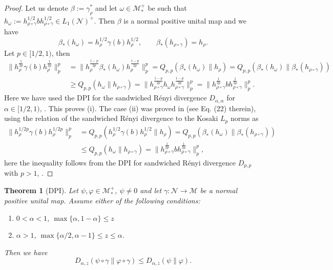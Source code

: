 \documentclass[12pt]{article}
\newtheorem{theorem}{Theorem}
\theoremstyle{definition}
\theoremstyle{remark}
\def\Me{\mathcal M}
\def\Ne{\mathcal N}
\begin{document}
\begin{proof} Let us denote $\beta:=\gamma_\rho^*$ and let $\omega\in \Me_*^+$ be such
that 
$h_\omega:=h_{\rho\circ\gamma}^{1/2}bh_{\rho\circ\gamma}^{1/2}\in L_1(\Ne)^+$. Then
$\beta$ is a normal positive unital map and  we have 
\[
\beta_*(h_\omega)=h_\rho^{1/2}\gamma(b)h_\rho^{1/2},\qquad
\beta_*(h_{\rho\circ\gamma})=h_\rho.
\]
Let $p\in [1/2,1)$, then  
\begin{align*}
\|h_{\rho}^{\frac{1}{2p}}\gamma(b)h_{\rho}^{\frac{1}{2p}}\|^p_p&=
\|h_\rho^{\frac{1-p}{2p}}\beta_*(h_\omega)h_\rho^{\frac{1-p}{2p}}\|_p^p=
Q_{p,p}(\beta_*(h_\omega)\|h_\rho)=Q_{p,p}(\beta_*(h_\omega)\|\beta_*(h_{\rho\circ\gamma}))\\
&\ge  Q_{p,p}(h_\omega\|h_{\rho\circ\gamma})=\|h_{\rho\circ\gamma}^{\frac{1-p}{2p}}h_\omega
h_{\rho\circ\gamma}^{\frac{1-p}{2p}}\|_p^p=\|h_{\rho\circ\gamma}^{\frac{1}{2p}}bh_{\rho\circ\gamma}^{\frac{1}{2p}}\|^p_p.
\end{align*}
Here we have used the DPI for the sandwiched R\'enyi  divergence $D_{\alpha,\alpha}$ for
$\alpha\in [1/2,1)$, \cite[Theorem 4.1]{jencova2021renyi}.  This proves (i). 
The case (ii) was proved in \cite{kato2023onrenyi} (see Eq. (22) therein), using the
relation of the sandwiched R\'enyi divergence to the Kosaki $L_p$ norms as
\begin{align*}
\|h_\rho^{1/2p}\gamma(b)h_\rho^{1/2p}\|_p^p&=Q_{p,p}(h_\rho^{1/2}\gamma(b)h_\rho^{1/2}\|h_\rho)=Q_{p,p}(\beta_*(h_\omega)\|\beta_*(h_{\rho\circ\gamma}))\\
&\le
Q_{p,p}(h_\omega\|h_{\rho\circ\gamma})=\|h_{\rho\circ\gamma}^{\frac{1}{2p}}bh_{\rho\circ\gamma}^{\frac{1}{2p}}\|^p_p,
\end{align*}
here the inequality follows from the DPI for sandwiched R\'enyi divergence $D_{p,p}$ with
$p>1$, \cite[]{jencova2018renyi}.


\end{proof}




\begin{theorem}[DPI] \label{thm:dpi} Let $\psi,\varphi\in \Me_*^+$, $\psi\ne 0$ and let $\gamma:
\Ne\to \Me$ be a normal positive unital map. Assume either of the following conditions:
\begin{enumerate}
\item[(i)] $0<\alpha<1$, $\max\{\alpha,1-\alpha\}\le z$
\item[(ii)] $\alpha>1$, $\max\{\alpha/2,\alpha-1\}\le z\le \alpha$.
\end{enumerate}
Then we have
\[
D_{\alpha,z}(\psi\circ\gamma\|\varphi\circ\gamma)\le D_{\alpha,z}(\psi\|\varphi).
\]


\end{theorem}
\end{document}

